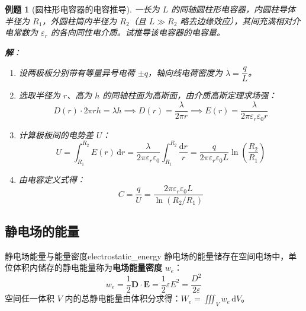 \documentclass[11pt,a4paper,fontset=fandol]{ctexart}
\newtheorem{example}{例题}[section]
\theoremstyle{remark}
\begin{document}
\begin{example}[圆柱形电容器的电容推导]
一长为 $L$ 的同轴圆柱形电容器，内圆柱导体半径为 $R_1$，外圆柱筒内半径为 $R_2$（且 $L \gg R_2$ 略去边缘效应），其间充满相对介电常数为 $\varepsilon_r$ 的各向同性电介质。试推导该电容器的电容量。

\textbf{解}：
\begin{enumerate}
    \item 设两极板分别带有等量异号电荷 $\pm q$，轴向线电荷密度为 $\lambda = \dfrac{q}{L}$。
    \item 选取半径为 $r$、高为 $h$ 的同轴柱面为高斯面，由介质高斯定理求场强：
    \begin{equation*}
        D(r) \cdot 2\pi r h = \lambda h \implies D(r) = \frac{\lambda}{2\pi r} \implies E(r) = \frac{\lambda}{2\pi \varepsilon_r \varepsilon_0 r}
    \end{equation*}
    \item 计算极板间的电势差 $U$：
    \begin{equation*}
        U = \int_{R_1}^{R_2} E(r)\,\mathrm{d}r = \frac{\lambda}{2\pi\varepsilon_r\varepsilon_0}\int_{R_1}^{R_2} \frac{\mathrm{d}r}{r} = \frac{q}{2\pi\varepsilon_r\varepsilon_0 L}\ln\left(\frac{R_2}{R_1}\right)
    \end{equation*}
    \item 由电容定义式得：
    \begin{equation*}
        C = \frac{q}{U} = \frac{2\pi\varepsilon_r\varepsilon_0 L}{\ln(R_2 / R_1)}
    \end{equation*}
\end{enumerate}
\end{example}

\subsection{静电场的能量}

\begin{definition}{静电场能量与能量密度}{electrostatic_energy}
静电场的能量储存在空间电场中，单位体积内储存的静电能量称为\textbf{电场能量密度} $w_e$：
\begin{equation}
    w_e = \frac{1}{2}\bm{D}\cdot\bm{E} = \frac{1}{2}\varepsilon E^2 = \frac{D^2}{2\varepsilon}
\end{equation}
空间任一体积 $V$ 内的总静电能量由体积分求得：$W_e = \iiint_V w_e\,\mathrm{d}V$。
\end{definition}
\end{document}
